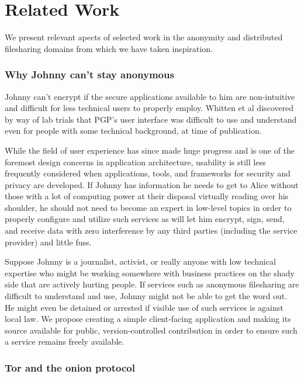 \section{Related Work}

We present relevant apects of selected work in the anonymity and
distributed filesharing domains from which we have taken inspiration.

\subsubsection*{Why Johnny can't stay anonymous}

Johnny can't encrypt if the secure applications available to him are non-intuitive and difficult for
less technical users to properly employ. Whitten et al discovered by way of lab trials that PGP's
user interface was difficult to use and understand even for people with some technical background,
at time of publication.

While the field of user experience has since made huge progress and is one of the foremost design
concerns in application architecture, usability is still less frequently considered when applications,
tools, and frameworks for security and privacy are developed. If Johnny has information he needs
to get to Alice without those with a lot of computing power at their disposal virtually reading over
his shoulder, he should not need to become an expert in low-level topics in order to properly configure
and utilize such services as will let him encrypt, sign, send, and receive data with zero interference
by any third parties (including the service provider) and little fuss.

Suppose Johnny is a journalist, activist, or really anyone with low technical expertise who might be working
somewhere with business practices on the shady side that are actively hurting people.
If services such as anonymous filesharing are difficult to understand and use, Johnny might not be able to get the
word out. He might even be detained or arrested if visible use of such services is against local law. We
propose creating a simple client-facing application and making its source available for public, version-controlled
contribution in order to ensure such a service remains freely available.

\subsubsection*{Tor and the onion protocol}

